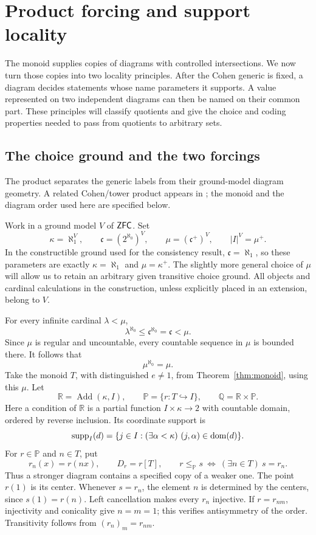 \section{Product forcing and support locality}\label{sec:forcing}

The monoid supplies copies of diagrams with controlled intersections.
We now turn those copies into two locality principles.  After the Cohen
generic is fixed, a diagram decides statements whose name parameters it
supports.  A value represented on two independent diagrams can then be
named on their common part.  These principles will classify quotients
and give the choice and coding properties needed to pass from quotients
to arbitrary sets.

\subsection{The choice ground and the two forcings}

The product separates the generic labels from their ground-model diagram
geometry. A related Cohen/tower product appears in
\cite[Section~3]{HolySchilhan2025}; the monoid and the diagram order used
here are specified below.

Work in a ground model \(V\) of \(\mathsf{ZFC}\).  Set
\[
 \kappa=\aleph_1^V,\qquad
 \mathfrak c=(2^{\aleph_0})^V,\qquad
 \mu=(\mathfrak c^+)^V,
 \qquad |I|^V=\mu^+.
\]
In the constructible ground used for the consistency result,
\(\mathfrak c=\aleph_1\), so these parameters are exactly
\(\kappa=\aleph_1\) and \(\mu=\kappa^+\).
The slightly more general choice of \(\mu\) will allow us to retain an
arbitrary given transitive choice ground.
All objects and cardinal calculations in the construction, unless
explicitly placed in an extension, belong to \(V\).

For every infinite cardinal \(\lambda<\mu\),
\[
 \lambda^{\aleph_0}\leq
 \mathfrak c^{\aleph_0}=\mathfrak c<\mu.
\]
Since \(\mu\) is regular and uncountable, every countable sequence in
\(\mu\) is bounded there.  It follows that
\begin{equation}\label{eq:ground-countable-arithmetic}
 \mu^{\aleph_0}=\mu.
\end{equation}
Take the monoid \(T\), with distinguished \(e\neq1\), from
Theorem~\ref{thm:monoid}, using this \(\mu\).
Let
\[
 \mathbb R=\operatorname{Add}(\kappa,I),\qquad
 \mathbb P=\{r:T\hookrightarrow I\},
 \qquad \mathbb Q=\mathbb R\times\mathbb P .
\]
Here a condition of \(\mathbb R\) is a partial function
\(I\times\kappa\to2\) with countable domain, ordered by reverse
inclusion.  Its coordinate support is
\[
 \operatorname{supp}_I(d)=
 \{j\in I:(\exists\alpha<\kappa)\ (j,\alpha)\in\operatorname{dom}(d)\}.
\]
For \(r\in\mathbb P\) and \(n\in T\), put
\[
 r_n(x)=r(nx),\qquad D_r=r[T],
 \qquad r\leq_{\mathbb P}s
       \ \Longleftrightarrow\
       (\exists n\in T)\ s=r_n .
\]
Thus a stronger diagram contains a specified copy of a weaker one.
The point \(r(1)\) is its center.  Whenever \(s=r_n\), the element
\(n\) is determined by the centers, since \(s(1)=r(n)\).
Left cancellation makes every \(r_n\) injective.  If
\(r=r_{nm}\), injectivity and conicality give \(n=m=1\); this
verifies antisymmetry of the order.  Transitivity follows from
\((r_n)_m=r_{nm}\).

